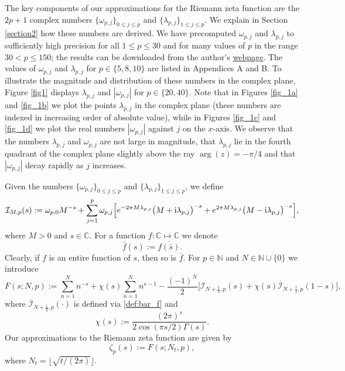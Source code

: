 \documentclass[12pt]{article}
\def\c{{\mathbb C}}
\def\i{{\textnormal i}}
\def\ii{{\mathcal I}}
\theoremstyle{definition}
\begin{document}
The key components of our approximations for the Riemann zeta function are the $2p+1$ complex numbers $\{\omega_{p,j}\}_{0\le j \le p}$ and $\{\lambda_{p,j}\}_{1\le j \le p}$. We explain in Section \ref{section2} how these numbers are derived. We have precomputed $\omega_{p,j}$ and  $\lambda_{p,j}$ to sufficiently high precision for 
 all $1\le p\le 30$ and for many values of $p$ in the range $30<p\le 150$; the results can be downloaded from the author's  \href{https://kuznetsovmath.ca/}{webpage}. 
The values of $\omega_{p,j}$ and $\lambda_{p,j}$ for $p \in \{5,8,10\}$ are listed in Appendices A and B. To illustrate the magnitude and distribution of these numbers in the complex plane, Figure \ref{fig1} displays $\lambda_{p,j}$ and $|\omega_{p,j}|$ for $p\in \{20,40\}$. Note that in Figures \ref{fig_1a} and \ref{fig_1b} we plot the points $\lambda_{p,j}$ in the complex plane (these numbers are indexed in increasing order of absolute value), while in Figures
\ref{fig_1c} and \ref{fig_1d} we plot the real numbers $|\omega_{p,j}|$ against $j$ on the $x$-axis. We observe that the numbers $\lambda_{p,j}$ and $\omega_{p,j}$ are not large in magnitude, that $\lambda_{p,j}$  lie in the fourth quadrant of the complex plane slightly above the ray $\arg(z)=-\pi/4$ and that  $|\omega_{p,j}|$ decay rapidly as $j$ increases. 

Given the numbers $\{\omega_{p,j}\}_{0\le j \le p}$ and $\{\lambda_{p,j}\}_{1\le j \le p}$, we define
\begin{equation}\label{def:ii_Mp}
\ii_{M,p}(s):= \omega_{p,0} M^{-s}   + \sum\limits_{j=1}^p 
\omega_{p,j} \Big[
e^{-2 \pi M   \lambda_{p,j}} 
 \big(M+ \i \lambda_{p,j}\big)^{-s}
+e^{2  \pi M    \lambda_{p,j}} 
 \big(M- \i \lambda_{p,j} \big)^{-s} \Big],
\end{equation}
where  $M>0$ and $s\in \c$.
For a function $f : \c \mapsto \c$  we denote
\begin{equation}\label{def:bar_f}
\bar{f}(s):={\overline {f(\bar s)}}. 
\end{equation}
Clearly, if $f$ is an entire function of $s$, then so is $\bar f$. For $p\in {\mathbb N}$  and $N \in {\mathbb N} \cup \{0\}$ we introduce
\begin{equation}\label{def:F_sNP}
F(s;N,p):=\sum\limits_{n=1}^{N} n^{-s} + \chi(s) \sum\limits_{n=1}^{N} n^{s-1}-
\frac{(-1)^{N} }{2} \Big[ {\mathcal I}_{N+\frac{1}{2},p}(s)+ 
\chi(s) \overline{\ii}_{N+\frac{1}{2},p}(1- s)\Big], 
\end{equation}
where  $\overline{\ii}_{N+\frac{1}{2},p}(\cdot)$ is defined via \eqref{def:bar_f} and
\begin{equation}\label{def:chi}
\chi(s):=\frac{(2\pi)^s}{2\cos(\pi s/2) \Gamma(s)}.
\end{equation}
Our approximations to the Riemann zeta function are given by
\begin{equation}\label{def:zeta_p}
\zeta_p(s):=F(s;N_t,p),
\end{equation}
where $N_t=\lfloor \sqrt{t/(2\pi)} \rfloor$. 
\end{document}
